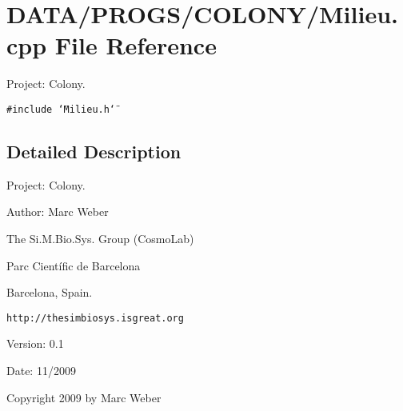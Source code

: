 \section{DATA/PROGS/COLONY/Milieu.cpp File Reference}
\label{Milieu_8cpp}
Project: Colony. 

{\tt \#include \char`\"{}Milieu.h\char`\"{}}\par


\subsection{Detailed Description}
Project: Colony. 

\begin{Desc}
\item[Author:]Marc Weber\par
 The Si.M.Bio.Sys. Group (CosmoLab)\par
 Parc Científic de Barcelona\par
 Barcelona, Spain.\par
 {\tt http://thesimbiosys.isgreat.org} \end{Desc}
\begin{Desc}
\item[Version:]0.1 \end{Desc}
\begin{Desc}
\item[Date:]11/2009\end{Desc}
Copyright 2009 by Marc Weber 